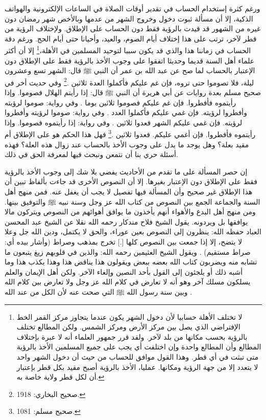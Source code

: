 ورغم كثرة إستخدام الحساب في تقدير أوقات الصلاة في الساعات الإلكترونية والهواتف الذكية، إلا أن مسألة ثبوت دخول وخروج الشهر من عدمها وبالأخص شهر رمضان دون غيره من الشهور قد قيدت بالرؤية فقط دون الحساب على الإطلاق. ولإختلاف الرؤية من قطر لآخر، ترتب على هذا إختلاف أيام الصوم، والعيد، وأحيانا حتى أيام الحج. ورغم دقة الحساب في زماننا هذا والذي قد يكون سببا لتوحيد المسلمين في الأهلة،\footnote{لا تختلف الأهلة حسابيا لأن دخول الشهر يكون عندما يتجاوز مركز القمر الخط الإفتراضي الذي يصل بين مركز الأرض ومركز الشمس. ولكن المطالع تختلف بالرؤية بحسب مكانها من بلد لآخر. ولقد قرر جمهور العلماء أنه لا عبرة بإختلاف المطالع وأن المطالع واحدة وإن اختلفت أي يجب على جميع المسلمين الأخذ بالرؤية متى تبثت في أي قطر. وهذا القول موافق للحساب من حيث أن دخول الشهر واحد لا يتعدد إلا من جهة الرؤية ومكانها. عمليا، الأخذ بالرؤية أصبح مقيد بكل قطر بإعتبار أن لكل قطر ولاية خاصة به.} إلا أن أكثر علماء أهل السنة قديما وحديثا اتفقوا على وجوب الأخذ بالرؤية فقط على الإطلاق دون الإعتبار بالحساب لما صح عن عبد الله بن عمر أن النبي ﷺ قال: الشهر تسع وعشرون ليلة، فلا تصوموا حتى تروه، فإن غم عليكم فأكملوا العدة ثلاثين \href{https://shamela.ws/book/1284/1257#p1}{\faExternalLink} \cite{bukhari}.\footnote{صحيح البخاري: 1918.} وفي حديث أخر في صحيح مسلم بعدة روايات عن أبي هريرة أن النبي ﷺ قال: إذا رأيتم الهلال فصوموا. وإذا رأيتموه فأفطروا. فإن غم عليكم فصوموا ثلاثين يوما \href{https://shamela.ws/book/1727/2446#p2}{\faExternalLink}. وفي رواية: صوموا لرؤيته وأفطروا لرؤيته. فإن غمي عليكم فأكملوا العدد \href{https://shamela.ws/book/1727/2447#p2}{\faExternalLink}. وفي رواية: صوموا لرؤيته وأفطروا لرؤيته. فإن غمي عليكم الشهر فعدوا ثلاثين \href{https://shamela.ws/book/1727/2448#p2}{\faExternalLink}. وفي رواية: إذا رأيتموه فصوموا. وإذا رأيتموه فأفطروا. فإن أغمي عليكم. فعدوا ثلاثين \href{https://shamela.ws/book/1727/2449#p2}{\faExternalLink} \cite{muslim}.\footnote{صحيح مسلم: 1081.} فهل هذا الحكم هو على الإطلاق أم مقيد بعلة؟ وهل يوجد ما يدل على وجوب الأخذ بالحساب عند زوال هذه العلة؟ فهذه أسئلة حري بنا أن نتمعن ونبحث فيها لمعرفة الحق في ذلك.

إن حصر المسألة على ما تقدم من الأحاديث يفضي بلا شك إلى وجوب الأخذ بالرؤية فقط على الإطلاق دون الإعتبار بغيرها. إلا أن النصوص الأخرى قد جاءت بألفاظ تبين أن هذا الإطلاق غير صحيح وأن المسألة فيها تفصيل لا يجب أن يغفل عنه. فمن منهج أهل السنة والجماعة الجمع بين النصوص من كتاب الله عز وجل وسنة نبيه ﷺ والتوفيق بينها. ومن منهج أهل البدع والأهواء أنهم يأخذون ما يوافق أهوائهم من النصوص ويتركون مالا يوافقها بل ويردونه. يقول الشيخ فلاح مندكار رحمه الله نقلا عن الشيخ عبد المحسن العباد حفظه الله: ينظرون إلى النصوص بعين عوراء، والحق لا يكتمل، ودين الله جل وعلا لا يتضح، إلا إذا جمعت بين النصوص كلها [.] تخرج بمذهب وصراط (وأشار بيده أي: صراط مستقيم) \href{https://www.youtube.com/watch?v=PEQsmhJX51w}{\faExternalLink}. ويقول الشيخ العثيمين رحمه الله: والذين في قلوبهم زيغ يتبعون ما تشابه منه ويضربون كتاب الله بعضه ببعض ويقولون هذا يناقض هذا وهذا يكذب هذا وما أشبه ذلك أو يلجئون إلى القول بأحد النصين وإلغاء الآخر. ولكن أهل الإيمان والعلم يسلكون مسلك آخر وهو أنه لا تعارض في كلام الله عز وجل ولا تعارض بين كلام الله وبين سنة رسول الله ﷺ التي صحت عنه لأن الكل من عند الله \href{https://www.youtube.com/watch?v=KvRTXkTmeew}{\faExternalLink}.

